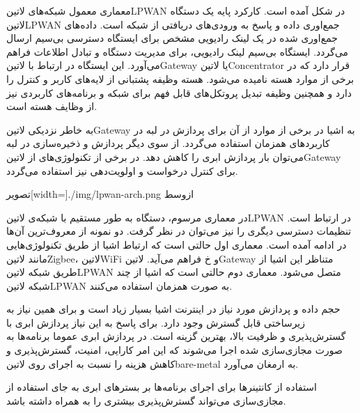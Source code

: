 
معماری معمول شبکه‌های ‌لاتین{LPWAN} در شکل  آمده است.
کارکرد پایه یک دستگاه ‌لاتین{LPWAN} جمع‌اوری داده و پاسخ به ورودی‌های دریافتی از شبکه است.
داده‌های جمع‌اوری شده در یک لینک رادیویی مشخص برای ایستگاه دسترسی بی‌سیم ارسال می‌گردد.
ایستگاه بی‌سیم لینک رادیویی، برای مدیریت دستگاه و تبادل اطلاعات فراهم می‌آورد.
این ایستگاه در ارتباط با ‌لاتین{Gateway} یا ‌لاتین{Concentrator} قرار دارد که در برخی از موارد هسته نامیده می‌شود.
هسته وظیفه پشتبانی از لایه‌های کاربر و کنترل را دارد و همچنین وظیفه تبدیل پروتکل‌های قابل فهم برای شبکه و برنامه‌های کاربردی نیز از وظایف هسته است.

به خاطر نزدیکی ‌لاتین{Gateway} به اشیا در برخی از موارد از آن برای پردازش در لبه در کاربردهای همزمان استفاده می‌گردد.
از سوی دیگر پردازش و ذخیره‌سازی در لبه می‌توان بار پردازش ابری را کاهش دهد. در برخی از تکنولوژی‌های
از ‌لاتین{Gateway} برای کنترل درخواست و اولویت‌دهی نیز استفاده می‌گردد.

‌تصویر[width=\textwidth]{./img/lpwan-arch.png}
‌ازوسط

در معماری مرسوم، دستگاه به طور مستقیم با شبکه‌ی ‌لاتین{LPWAN} در ارتباط است.
تنظیمات دسترسی دیگری را نیز می‌توان در نظر گرفت. دو نمونه از معروف‌ترین آن‌ها
در ادامه آمده است.
معماری اول حالتی است که ارتباط اشیا از طریق تکنولوژی‌هایی مانند ‌لاتین{Zigbee}،
‌لاتین{WiFi} و ‌خ فراهم می‌آید. ‌لاتین{Gateway} متناظر این اشیا از طریق
شبکه ‌لاتین{LPWAN} متصل می‌شود.
معماری دوم حالتی است که اشیا از چند شبکه ‌لاتین{LPWAN} به صورت همزمان استفاده می‌کنند.


حجم داده و پردازش مورد نیاز در اینترنت اشیا بسیار زیاد است و برای همین نیاز به زیرساختی قابل گسترش وجود دارد.
برای پاسخ به این نیاز پردازش ابری با گسترش‌پذیری و ظرفیت بالا، بهترین گزینه است.
در پردازش ابری عموما برنامه‌ها به صورت مجازی‌سازی شده اجرا می‌شوند که این امر کارایی، امنیت، گسترش‌پذیری و کاهش هزینه
را نسبت به اجرای روی ‌لاتین{bare-metal} به ارمغان می‌آورد.

استفاده از کانتینرها برای اجرای برنامه‌ها بر بسترهای ابری به جای استفاده از مجازی‌سازی می‌تواند گسترش‌پذیری
بیشتری را به همراه داشته باشد.

